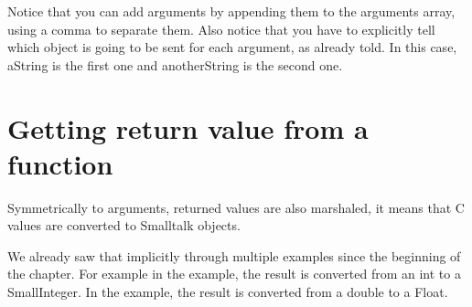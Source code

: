 \documentclass[a4paper,10pt,twoside]{book}
\begin{document}
Notice that you can add arguments by appending them to the arguments array,
using a comma to separate them. Also notice that you have to explicitly tell
which object is going to be sent for each argument, as already told. In this
case, aString is the first one and anotherString is the second one.


\section{Getting return value from a function}\label{sec:return_values}

Symmetrically to arguments, returned values are also marshaled, it means that C values are converted to Smalltalk objects. 

We already saw that implicitly through multiple examples since the beginning of the chapter.
For example in the  example, the result is converted from an int to a SmallInteger.
In the  example, the  result is converted from a double to a Float.




% 
% 
% 
% 
% 
% 
% 
%  
% 
\end{document}
